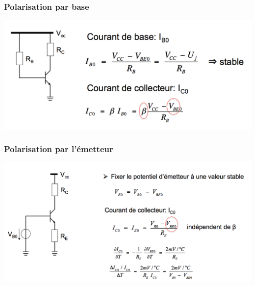 \documentclass[]{article}
\begin{document}
\subsubsection{Polarisation par base}
\includegraphics[scale=0.5]{polbase}
\subsubsection{Polarisation par l'émetteur}
\includegraphics[scale=0.5]{polem}
\end{document}
